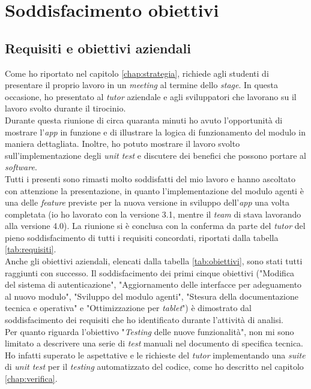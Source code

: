 \section{Soddisfacimento obiettivi}
\subsection{Requisiti e obiettivi aziendali}
Come ho riportato nel capitolo \ref{chap:strategia}, {\company} richiede agli studenti di presentare il proprio 
lavoro in un \textit{meeting} al termine dello \textit{stage}. In questa occasione, ho presentato al 
\textit{tutor} aziendale e agli sviluppatori che lavorano su {\movi} il lavoro svolto durante il tirocinio.\\
Durante questa riunione di circa quaranta minuti ho avuto l'opportunità di mostrare l'\textit{app} in funzione 
e di illustrare la logica di funzionamento del modulo in maniera dettagliata. 
Inoltre, ho potuto mostrare il lavoro svolto sull'implementazione degli \textit{unit test} e discutere dei 
benefici che possono portare al \textit{software}.\\
Tutti i presenti sono rimasti molto soddisfatti del mio lavoro e hanno ascoltato con attenzione la presentazione, 
in quanto l'implementazione del modulo agenti è una delle \textit{feature} previste per la nuova versione in sviluppo 
dell'\textit{app} una volta completata (io ho lavorato con la versione 3.1, mentre il \textit{team} di {\company} stava 
lavorando alla versione 4.0). La riunione si è conclusa con la conferma da parte del \textit{tutor} del pieno 
soddisfacimento di tutti i requisiti concordati, riportati dalla tabella \ref{tab:requisiti}.\\
Anche gli obiettivi aziendali, elencati dalla tabella \ref{tab:obiettivi}, sono stati tutti raggiunti con 
successo. Il soddisfacimento dei primi cinque obiettivi ("Modifica del sistema di autenticazione", 
"Aggiornamento delle interfacce per adeguamento al nuovo modulo", "Sviluppo del modulo agenti", "Stesura 
della documentazione tecnica e operativa" e "Ottimizzazione per \textit{tablet}") è dimostrato dal soddisfacimento 
dei requisiti che ho identificato durante l'attività di analisi.\\
Per quanto riguarda l'obiettivo "\textit{Testing} delle nuove funzionalità", 
non mi sono limitato a descrivere una serie di \textit{test} manuali nel documento di specifica tecnica. Ho infatti
superato le aspettative e le richieste del \textit{tutor} implementando una \textit{suite} di \textit{unit test} per 
il \textit{testing} automatizzato del codice, come ho descritto nel capitolo \ref{chap:verifica}.

